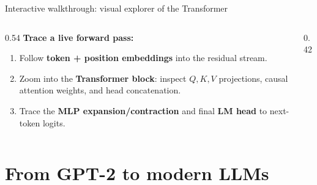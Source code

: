 \documentclass[handout]{beamer}
\begin{document}
\begin{frame}{Interactive walkthrough: visual explorer of the Transformer}
  \begin{columns}[c]
    \begin{column}{0.54\linewidth}
      \textbf{Trace a live forward pass:}
      \begin{enumerate}
          \setlength{\itemsep}{6pt}
        \item Follow \textbf{token + position embeddings} into the residual stream.
        \item Zoom into the \textbf{Transformer block}: inspect $Q, K, V$ projections, causal attention weights, and head concatenation.
        \item Trace the \textbf{MLP expansion/contraction} and final \textbf{LM head} to next-token logits.
      \end{enumerate}
    \end{column}
    \begin{column}{0.42\linewidth}
    \end{column}
  \end{columns}
\end{frame}

\section{From GPT-2 to modern LLMs}
\end{document}
